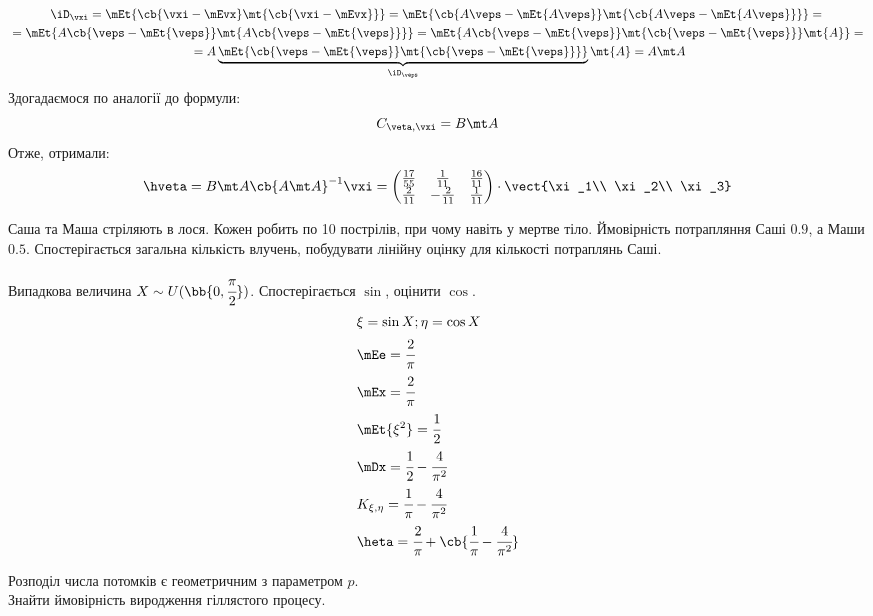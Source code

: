 \begin{tsk}
\begin{multline}
\iD_{\vxi} = \mEt{\cb{\vxi-\mEvx}\mt{\cb{\vxi-\mEvx}}} = \mEt{\cb{A\veps-\mEt{A\veps}}\mt{\cb{A\veps-\mEt{A\veps}}}} = {} \\ {} =  \mEt{A\cb{\veps-\mEt{\veps}}\mt{A\cb{\veps-\mEt{\veps}}}} = \mEt{A\cb{\veps-\mEt{\veps}}\mt{\cb{\veps-\mEt{\veps}}}\mt{A}} = {} \\ {} = A\underbrace{\mEt{\cb{\veps-\mEt{\veps}} \mt{\cb{\veps-\mEt{\veps}}}}}_{\iD_{\veps}}\mt{A} = A\mt A
\end{multline}
Здогадаємося по аналогії до формули:
\begin{equation}
C_{\veta,\vxi} = B \mt A
\end{equation}
Отже, отримали:
\begin{equation}
\hveta = B\mt A \cb{A \mt A}^{-1}\vxi = \begin{pmatrix}
\frac{17}{55} & \frac1{11} & \frac{16}{11}\\
\frac2{11}& -\frac{2}{11} & \frac1{11}
\end{pmatrix}\cdot\vect{\xi_1\\ \xi_2\\ \xi_3}
\end{equation}
\end{tsk}
\begin{tsk}
Саша та Маша стріляють в лося. Кожен робить по 10 пострілів, при чому навіть у мертве тіло. Ймовірність потрапляння Саші $0.9$, а Маши $0.5$. Спостерігається загальна кількість влучень, побудувати лінійну оцінку для кількості потраплянь Саші.\\
\end{tsk}
\begin{tsk}
Випадкова величина $X \sim U(\bb{0,\cfrac\pi2})$. Спостерігається $\sin$, оцінити $\cos$.
\begin{eqnarray}
&\xi = \sin X;\eta = \cos X\\
&\mEe = \cfrac2\pi \\
&\mEx = \cfrac2\pi\\
&\mEt{\xi^2} = \cfrac12\\
&\mDx=\cfrac12 - \cfrac4{\pi^2}\\
&K_{\xi,\eta} = \cfrac1\pi - \cfrac4{\pi^2}\\
&\heta = \cfrac2\pi +\cb{\cfrac1\pi -\cfrac4{\pi^2}}
\end{eqnarray}
\end{tsk}
\begin{tsk}
Розподіл числа потомків є геометричним з параметром $p$.\\
Знайти ймовірність виродження гіллястого процесу.
\end{tsk}
